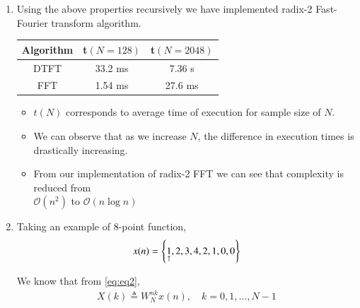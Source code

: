 \documentclass[journal,12pt,twocolumn]{IEEEtran}
\renewcommand\thesection{\arabic{section}}
\begin{document}
\begin{enumerate}[label=\thesection.\arabic*.,ref=\thesection.\theenumi]
\item Using the above properties recursively we have implemented radix-2 Fast-Fourier transform algorithm.

\begin{center}
 \begin{tabular}{||c c c||} 
 \hline
 Algorithm & t$(N=128)$ & t$(N=2048)$ \\ [0.5ex] 
 \hline\hline
 DTFT & 33.2 ms & 7.36 s \\ 
 \hline
 FFT & 1.54 ms & 27.6 ms \\ [1ex] 
 \hline
\end{tabular}
\end{center}

\begin{itemize}
    \item $t(N)$ corresponds to average time of execution for sample size of $N$.
    \item We can observe that as we increase $N$, the difference in execution times is drastically increasing.
    \item From our implementation of radix-2 FFT we can see that complexity is reduced from 
    \\ $\mathcal{O}(n^2)$ to $\mathcal{O}(n\log{}n)$ 
\end{itemize}

\item

Taking an example of 8-point function,
\begin{align}
    x(n) = \left\{\underset{\uparrow}{1},2,3,4,2,1,0,0\right\} 
\end{align}

We know that from \ref{eq:eq2},
\begin{align}
        X(k) \triangleq W_{N}^{nk} x(n), \quad k=0,1, \ldots, N-1
\end{align}


\end{enumerate}
\end{document}
